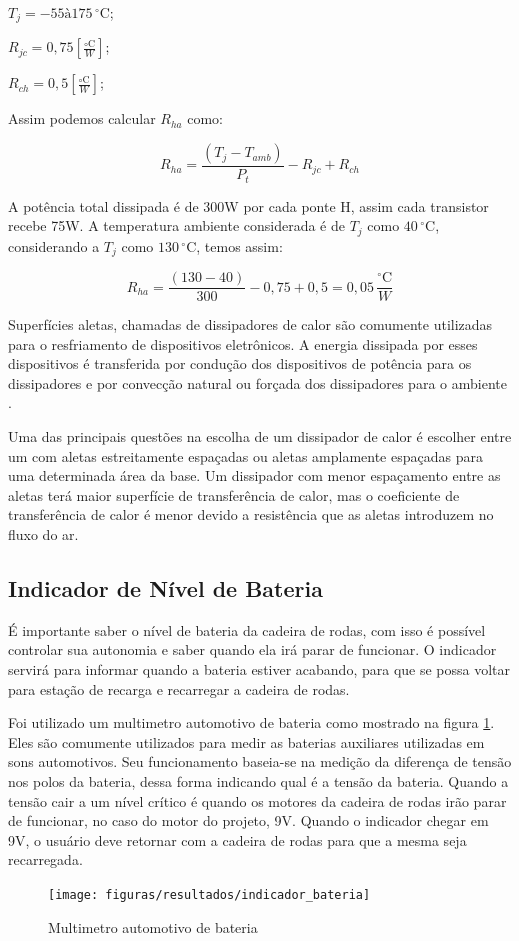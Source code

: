 $T_j = -55 à 175\,^{\circ}\mathrm{C}$;

$R_{jc} = 0,75[\frac{{\circ}\mathrm{C}}{W}]$;

$R_{ch} = 0,5[\frac{{\circ}\mathrm{C}}{W}]$;

Assim podemos calcular $R_{ha}$ como:

\begin{equation}
 R_{ha} = \frac{(T_j - T_{amb})}{P_t} - R_{jc} + R_{ch}
\end{equation}

A potência total dissipada é de 300W por cada ponte H, assim cada transistor recebe 75W. A
temperatura ambiente considerada é de $T_j$ como $40\,^{\circ}\mathrm{C}$, considerando a $T_j$ como $130\,^{\circ}\mathrm{C}$,
temos assim:

\begin{equation}
 R_{ha} = \frac{(130 - 40)}{300} - 0,75 + 0,5 = 0,05\,\frac{^{\circ}\mathrm{C}}{{W}}
\end{equation}

Superfícies aletas, chamadas de dissipadores de calor são
comumente utilizadas para o resfriamento de dispositivos eletrônicos. A energia dissipada por
esses dispositivos é transferida por condução dos dispositivos de potência para os dissipadores
e por convecção natural ou forçada dos dissipadores para o ambiente \cite[p.~434-439]{cengel}.

Uma das principais questões na escolha de um dissipador de calor é escolher entre um com
aletas estreitamente espaçadas ou aletas amplamente espaçadas para uma determinada área
da base. Um dissipador com menor espaçamento entre as aletas terá maior superfície de
transferência de calor, mas o coeficiente de transferência de calor é menor devido a
resistência que as aletas introduzem no fluxo do ar.

\subsection{Indicador de Nível de Bateria}

É importante saber o nível de bateria da cadeira de rodas, com isso é possível controlar sua autonomia e saber quando ela irá parar de funcionar. O indicador servirá para informar quando a bateria estiver acabando, para que se possa voltar para estação de recarga e recarregar a cadeira de rodas.

Foi utilizado um multimetro automotivo de bateria como mostrado na figura \ref{fig:indicador_bateria}. Eles são comumente utilizados para medir as baterias auxiliares utilizadas em sons automotivos. Seu funcionamento baseia-se na medição da diferença de tensão nos polos da bateria, dessa forma indicando qual é a tensão da bateria. Quando a tensão cair a um nível crítico é quando os motores da cadeira de rodas irão parar de funcionar, no caso do motor do projeto, 9V. Quando o indicador chegar em 9V, o usuário deve retornar com a cadeira de rodas para que a mesma seja recarregada.

\begin{figure}[!ht]
  \center
  \texttt{[image: figuras/resultados/indicador\_bateria]}
  \caption{Multimetro automotivo de bateria}
  \label{fig:indicador_bateria}
\end{figure}
